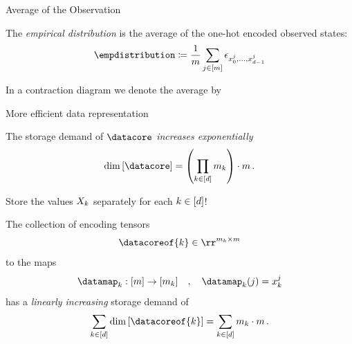 \documentclass{beamer}
\begin{document}


\begin{frame}{Average of the Observation}

The \emph{empirical distribution} is the average of the one-hot encoded observed states:
\begin{align*}
	\empdistribution \coloneqq \frac{1}{\datanum}\sum_{\datindexin} \onehotmapof{\catindicesof{\datindex}}
\end{align*}

In a contraction diagram we denote the average by %
\begin{center}
	
\end{center}

\end{frame}


\begin{frame}{More efficient data representation}

The storage demand of $\datacore$ \emph{increases exponentially }
	\[ \mathrm{dim}\left[\datacore\right] = \left( \facdim \right) \cdot \datanum \, . \]

\begin{block}{Store the values $X_{k}$ separately for each $k\in[d]$!}

\medskip

The collection of encoding tensors
	\[ \datacoreof{\atomenumerator} \in \rr^{\catdimof{\atomenumerator}\times\datanum} \]
to the maps
	\[ \datamap_{\atomenumerator} :[\datanum] \rightarrow [\catdimof{\atomenumerator}] \quad , \quad  \datamap_{\atomenumerator}(\datindex) =  \catindex^{\datindex}_{\atomenumerator}\]
has a \emph{linearly increasing} storage demand of 
	\[ \sum_{\atomenumeratorin} \mathrm{dim}\left[\datacoreof{\atomenumerator}\right] = \sum_{\atomenumeratorin} \catdimof{\atomenumerator}\cdot \datanum \, .  \]

\end{block}
\end{frame}
\end{document}
